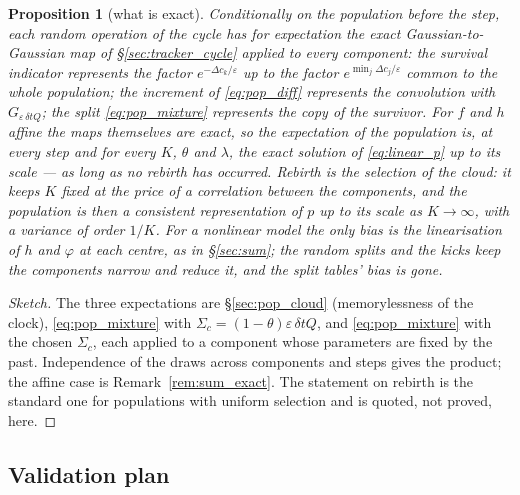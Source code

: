 \documentclass[11pt,a4paper]{article}
\newcommand{\eps}{\varepsilon}
\newcommand{\dt}{\,\delta t}
\theoremstyle{plain}
\newtheorem{proposition}{Proposition}
\theoremstyle{definition}
\theoremstyle{remark}
\begin{document}
\begin{proposition}[what is exact]
\label{prop:pop}
Conditionally on the population before the step, each random operation of the cycle has for expectation the exact Gaussian-to-Gaussian map of \S\ref{sec:tracker_cycle} applied to every component: the survival indicator represents the factor $e^{-\Delta c_k/\eps}$ up to the factor $e^{\min_j\Delta c_j/\eps}$ common to the whole population; the increment of \eqref{eq:pop_diff} represents the convolution with $G_{\eps\dt Q}$; the split \eqref{eq:pop_mixture} represents the copy of the survivor. For $f$ and $h$ affine the maps themselves are exact, so the expectation of the population is, at every step and for every $K$, $\theta$ and $\lambda$, the exact solution of \eqref{eq:linear_p} up to its scale --- as long as no rebirth has occurred. Rebirth is the selection of the cloud: it keeps $K$ fixed at the price of a correlation between the components, and the population is then a consistent representation of $p$ up to its scale as $K\to\infty$, with a variance of order $1/K$. For a nonlinear model the only bias is the linearisation of $h$ and $\varphi$ at each centre, as in \S\ref{sec:sum}; the random splits and the kicks keep the components narrow and reduce it, and the split tables' bias is gone.
\end{proposition}
\begin{proof}[Sketch]
The three expectations are \S\ref{sec:pop_cloud} (memorylessness of the clock), \eqref{eq:pop_mixture} with $\Sigma_c=(1-\theta)\eps\dt Q$, and \eqref{eq:pop_mixture} with the chosen $\Sigma_c$, each applied to a component whose parameters are fixed by the past. Independence of the draws across components and steps gives the product; the affine case is Remark~\ref{rem:sum_exact}. The statement on rebirth is the standard one for populations with uniform selection and is quoted, not proved, here.
\end{proof}

\subsection{Validation plan}
\label{sec:pop_valid}
\end{document}
